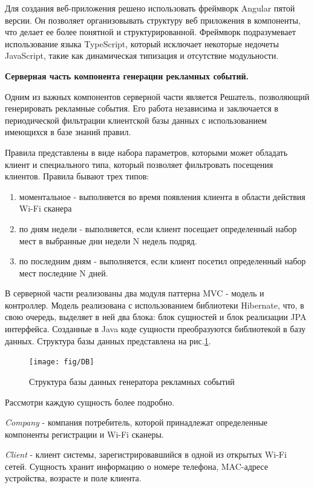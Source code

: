 Для создания веб-приложения решено использовать фреймворк Angular пятой версии. Он позволяет организовывать структуру веб приложения в компоненты, что делает ее более понятной и структурированной. Фреймворк подразумевает использование языка TypeScript, который исключает некоторые недочеты JavaScript, такие как динамическая типизация и отсутствие модульности.

\textbf{Серверная часть компонента генерации рекламных событий.}

Одним из важных компонентов серверной части является Решатель, позволяющий генерировать рекламные события. Его работа независима и заключается в периодической фильтрации клиентской базы данных с использованием имеющихся в базе знаний правил. 

Правила представлены в виде набора параметров, которыми может обладать клиент и специального типа, который позволяет фильтровать посещения клиентов. Правила бывают трех типов:

\begin{enumerate}
	\item моментальное - выполняется во время появления клиента в области действия Wi-Fi сканера
	\item по дням недели - выполняется, если клиент посещает определенный набор мест в выбранные дни недели N недель подряд.
	\item по последним дням - выполняется, если клиент посетил определенный набор мест последние N дней.
\end{enumerate}

В серверной части реализованы два модуля паттерна MVC - модель и контроллер. Модель реализована с использованием библиотеки Hibernate, что, в свою очередь, выделяет в ней два блока: блок сущностей и блок реализации JPA интерфейса. Созданные в Java коде сущности преобразуются библиотекой в базу данных. Структура базы данных представлена на рис.\ref{fig:DB}.

\begin{figure}[H]
	\centering
	\texttt{[image: fig/DB]}
	\caption{Структура базы данных генератора рекламных событий}
	\label{fig:DB}
\end{figure}

Рассмотри каждую сущность более подробно.

\textit{Company} - компания потребитель, которой принадлежат определенные компоненты регистрации и Wi-Fi сканеры.  

\textit{Client} - клиент системы, зарегистрировавшийся в одной из открытых Wi-Fi сетей. Сущность хранит информацию о номере телефона, MAC-адресе устройства, возрасте  и поле клиента.

